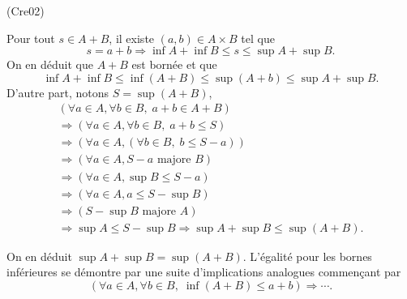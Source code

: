 \begin{tiny}(Cre02)\end{tiny} Pour tout $s \in A+B$, il existe $(a,b) \in A\times B$ tel que 
\[
 s = a + b \Rightarrow
 \inf A + \inf B \leq s \le \sup A + \sup B.
\]
On en déduit que $A+B$ est bornée et que
\[
 \inf A + \inf B \leq \inf(A+B) \leq \sup(A+b) \leq \sup A + \sup B.
\]
D'autre part, notons $S = \sup(A+B)$,
\begin{multline*}
 \left( \forall a \in A, \forall b \in B, \; a+b \in A+B\right) \\
 \Rightarrow
 \left( \forall a \in A, \forall b \in B, \; a+b \leq S \right) \\
 \Rightarrow
 \left( \forall a \in A, \left( \forall b \in B, \; b \leq S -a \right) \right) \\
 \Rightarrow
 \left( \forall a \in A,  S -a \text{ majore } B \right) \\
 \Rightarrow
 \left( \forall a \in A,  \sup B \leq S -a  \right) \\
 \Rightarrow
 \left( \forall a \in A,  a \leq S - \sup B  \right) \\
 \Rightarrow
 \left( S - \sup B \text{ majore } A\right) \\
 \Rightarrow \sup A \leq S - \sup B
 \Rightarrow \sup A + \sup B \leq \sup(A+B).
\end{multline*}

On en déduit $\sup A + \sup B = \sup(A+B)$.\newline
L'égalité pour les bornes inférieures se démontre par une suite d'implications analogues commençant par 
\[
 \left( \forall a \in A, \forall b \in B, \; \inf(A+B) \leq a + b  \right) \Rightarrow \cdots.
\]
